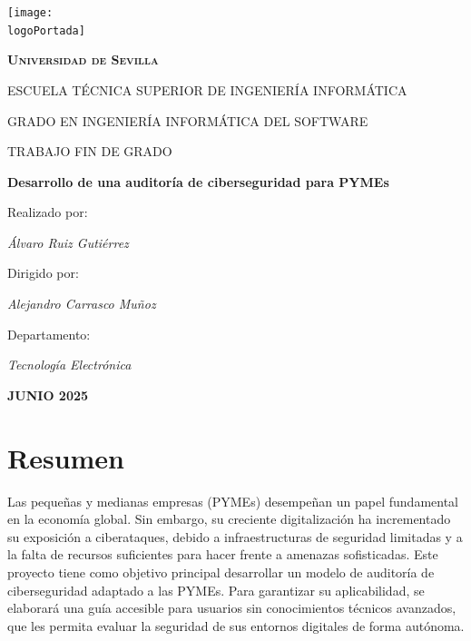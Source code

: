 \documentclass[a4paper, 11pt]{article}
\newcommand{\logoPortada}{images/logo_uni.png}
\begin{document}
    \begin{titlepage}
        \thispagestyle{empty}
        \centering
        \texttt{[image: \\logoPortada]} \par\vspace{1cm}
        {\scshape\LARGE \textbf{Universidad de Sevilla}}\par\vspace{1cm}
        {\scshape\Large ESCUELA TÉCNICA SUPERIOR DE INGENIERÍA INFORMÁTICA}\par\vspace{1cm}
        GRADO EN INGENIERÍA INFORMÁTICA DEL SOFTWARE\par\vspace{1cm}
        TRABAJO FIN DE GRADO\par\vspace{1cm}
        {\huge\bfseries Desarrollo de una auditoría de ciberseguridad para PYMEs}\par\vspace{1cm}
        Realizado por:\par\vspace{0.1cm}
        {\Large\itshape Álvaro Ruiz Gutiérrez}\par\vspace{1cm}
        Dirigido por:\par\vspace{0.1cm}
        {\Large\itshape Alejandro Carrasco Muñoz}\par\vspace{1cm}
        Departamento:\par\vspace{0.1cm}
        {\Large\itshape Tecnología Electrónica}\par\vspace{1cm}
        \textbf{JUNIO 2025}
    \end{titlepage}
    \clearpage



\setcounter{page}{1}






\thispagestyle{nohead}
\section*{Resumen}
Las pequeñas y medianas empresas (PYMEs) desempeñan un papel fundamental en la economía global. Sin embargo, su creciente digitalización ha incrementado su exposición a ciberataques, debido a infraestructuras de seguridad limitadas y a la falta de recursos suficientes para hacer frente a amenazas sofisticadas.
Este proyecto tiene como objetivo principal desarrollar un modelo de auditoría de ciberseguridad adaptado a las PYMEs. Para garantizar su aplicabilidad, se elaborará una guía accesible para usuarios sin conocimientos técnicos avanzados, que les permita evaluar la seguridad de sus entornos digitales de forma autónoma.
\end{document}
